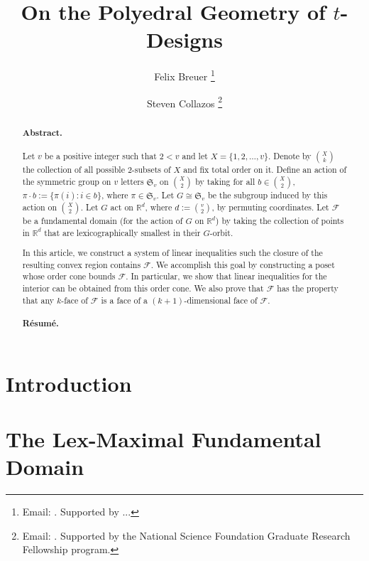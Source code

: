 \documentclass[submission%
]{dmtcs}
\author{Felix Breuer \addressmark{1}\thanks{Email: \email{felix@fbreuer.de}. Supported by ...}
  \and Steven Collazos \addressmark{2}\thanks{Email: \email{colla054@umn.edu}. Supported by the National Science Foundation Graduate Research Fellowship program.}
  }
\title[Formatting a submission for DMTCS]{On the Polyedral Geometry of \(t\)-Designs}
\begin{document}
\maketitle
\begin{abstract}
\paragraph{Abstract.}
Let \(v\) be a positive integer such that \(2 < v\) and let \(X = \{1, 2, \dots, v\}\). Denote by \(\binom{X}{k}\) the collection of all possible \(2\)-subsets of \(X\) and fix total order on it. Define an action of the symmetric group on \(v\) letters \(\mathfrak{S}_v\) on \(\binom{X}{2}\) by taking for all \(b \in \binom{X}{2}\), \(\pi \cdot b := \{\pi(i)  : i \in b\}\), where \(\pi \in \mathfrak{S}_v\). Let \(G \cong \mathfrak{S}_v\) be the subgroup induced by this action on \(\binom{X}{2}\). Let \(G\) act on \(\mathbb{R}^{d}\), where \(d:=\binom{v}{2}\), by permuting coordinates. Let \(\mathcal{F}\) be a fundamental domain (for the action of \(G\) on \(\mathbb{R}^d\)) by taking the collection of points in \(\mathbb{R}^d\) that are lexicographically smallest in their \(G\)-orbit.

In this article, we construct a system of linear inequalities such the closure of the resulting convex region contains \(\mathcal{F}\). We accomplish this goal by constructing a poset whose order cone bounds \(\mathcal{F}\). In particular, we show that linear inequalities for the interior can be obtained from this order cone. We also prove that \(\mathcal{F}\) has the property that any \(k\)-face of \(\mathcal{F}\) is a face of a \((k+1)\)-dimensional face of \(\mathcal{F}\).

\paragraph{R\'esum\'e.}


\end{abstract}


\section{Introduction}\label{intro}
\label{sec:in}





\section{The Lex-Maximal Fundamental Domain}\label{properties}
\label{sec:in}
\end{document}
